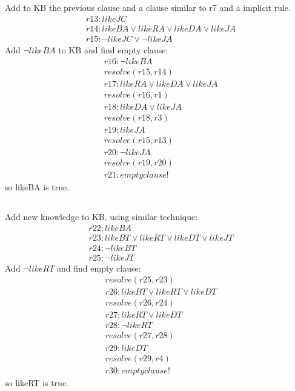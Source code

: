 \documentclass[12pt]{article}
\begin{document}
\subsection{}
Add to KB the previous clause and a clause similar to r7 and a implicit rule.
\begin{align*}
  &r13: likeJC \\
  &r14: likeBA \lor likeRA \lor likeDA \lor likeJA \\
  &r15: \neg likeJC \lor \neg likeJA
\end{align*}
Add $\neg likeBA$ to KB and find empty clause:
\begin{align*}
  &r16: \neg likeBA \\
  &resolve(r15, r14) \\
  &r17: likeRA \lor likeDA \lor likeJA \\
  &resolve(r16, r1) \\
  &r18: likeDA \lor likeJA \\
  &resolve(r18, r3) \\
  &r19: likeJA \\
  &resolve(r15, r13) \\
  &r20: \neg likeJA \\
  &resolve(r19, r20) \\
  &r21: empty clause!
\end{align*}
so likeBA is true.
\subsection{}
Add new knowledge to KB, using similar technique:
\begin{align*}
  &r22: likeBA \\
  &r23: likeBT \lor likeRT \lor likeDT \lor likeJT \\
  &r24: \neg likeBT \\
  &r25: \neg likeJT
\end{align*}
Add $\neg likeRT$ and find empty clause:
\begin{align*}
  &resolve(r25, r23) \\
  &r26: likeBT \lor likeRT \lor likeDT \\
  &resolve(r26, r24) \\
  &r27: likeRT \lor likeDT \\
  &r28: \neg likeRT \\
  &resolve(r27, r28) \\
  &r29: likeDT \\
  &resolve(r29, r4) \\
  &r30: empty clause!
\end{align*}
so likeRT is true.
\end{document}
